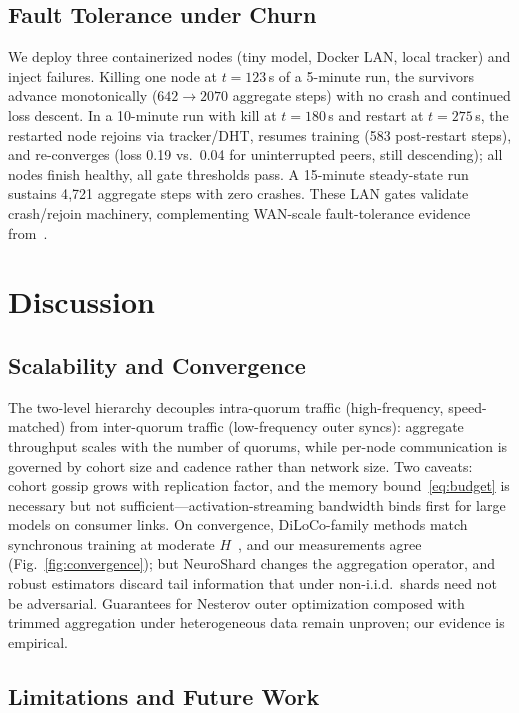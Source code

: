 \documentclass[conference]{IEEEtran}
\begin{document}
\subsection{Fault Tolerance under Churn}
\label{sec:eval-churn}

We deploy three containerized nodes (tiny model, Docker LAN, local tracker) and inject failures. Killing one node at $t{=}123$\,s of a 5-minute run, the survivors advance monotonically ($642 \to 2070$ aggregate steps) with no crash and continued loss descent. In a 10-minute run with kill at $t{=}180$\,s and restart at $t{=}275$\,s, the restarted node rejoins via tracker/DHT, resumes training (583 post-restart steps), and re-converges (loss 0.19 vs.\ 0.04 for uninterrupted peers, still descending); all nodes finish healthy, all gate thresholds pass. A 15-minute steady-state run sustains 4{,}721 aggregate steps with zero crashes. These LAN gates validate crash/rejoin machinery, complementing WAN-scale fault-tolerance evidence from~\cite{jaghouar2024intellect,ryabinin2023swarm}.

\section{Discussion}

\subsection{Scalability and Convergence}

The two-level hierarchy decouples intra-quorum traffic (high-frequency, speed-matched) from inter-quorum traffic (low-frequency outer syncs): aggregate throughput scales with the number of quorums, while per-node communication is governed by cohort size and cadence rather than network size. Two caveats: cohort gossip grows with replication factor, and the memory bound~\eqref{eq:budget} is necessary but not sufficient---activation-streaming bandwidth binds first for large models on consumer links. On convergence, DiLoCo-family methods match synchronous training at moderate $H$~\cite{douillard2023diloco,jaghouar2024opendiloco}, and our measurements agree (Fig.~\ref{fig:convergence}); but NeuroShard changes the aggregation operator, and robust estimators discard tail information that under non-i.i.d.\ shards need not be adversarial. Guarantees for Nesterov outer optimization composed with trimmed aggregation under heterogeneous data remain unproven; our evidence is empirical.

\subsection{Limitations and Future Work}
\label{sec:limitations}
\end{document}
